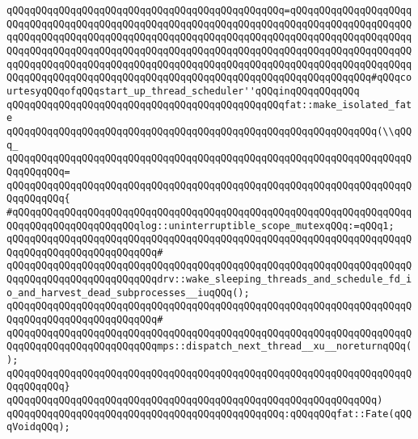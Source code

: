 \verb|qQQqqQQqqQQqqQQqqQQqqQQqqQQqqQQqqQQqqQQqqQQqqQQq=qQQqqQQqqQQqqQQqqQQqqQQqqQQqqQQqqQQqqQQqqQQqqQQqqQQqqQQqqQQqqQQqqQQqqQQqqQQqqQQqqQQqqQQqqQQqqQQqqQQqqQQqqQQqqQQqqQQqqQQqqQQqqQQqqQQqqQQqqQQqqQQqqQQqqQQqqQQqqQQqqQQqqQQqqQQqqQQqqQQqqQQqqQQqqQQqqQQqqQQqqQQqqQQqqQQqqQQqqQQqqQQqqQQqqQQqqQQqqQQqqQQqqQQqqQQqqQQqqQQqqQQqqQQqqQQqqQQqqQQqqQQqqQQqqQQqqQQqqQQqqQQqqQQqqQQqqQQqqQQqqQQqqQQqqQQqqQQqqQQqqQQqqQQqqQQqqQQqqQQqqQQq#qQQqcourtesyqQQqofqQQqstart_up_thread_scheduler''qQQqinqQQqqQQqqQQq|\newline
\verb|qQQqqQQqqQQqqQQqqQQqqQQqqQQqqQQqqQQqqQQqqQQqqQQqfat::make_isolated_fate|\newline
\verb|qQQqqQQqqQQqqQQqqQQqqQQqqQQqqQQqqQQqqQQqqQQqqQQqqQQqqQQqqQQqqQQq(\\qQQq_|\newline
\verb|qQQqqQQqqQQqqQQqqQQqqQQqqQQqqQQqqQQqqQQqqQQqqQQqqQQqqQQqqQQqqQQqqQQqqQQqqQQqqQQq=|\newline
\verb|qQQqqQQqqQQqqQQqqQQqqQQqqQQqqQQqqQQqqQQqqQQqqQQqqQQqqQQqqQQqqQQqqQQqqQQqqQQqqQQq{|\newline
\verb|#qQQqqQQqqQQqqQQqqQQqqQQqqQQqqQQqqQQqqQQqqQQqqQQqqQQqqQQqqQQqqQQqqQQqqQQqqQQqqQQqqQQqqQQqqQQqlog::uninterruptible_scope_mutexqQQq:=qQQq1;|\newline
\verb|qQQqqQQqqQQqqQQqqQQqqQQqqQQqqQQqqQQqqQQqqQQqqQQqqQQqqQQqqQQqqQQqqQQqqQQqqQQqqQQqqQQqqQQqqQQqqQQq#|\newline
\verb|qQQqqQQqqQQqqQQqqQQqqQQqqQQqqQQqqQQqqQQqqQQqqQQqqQQqqQQqqQQqqQQqqQQqqQQqqQQqqQQqqQQqqQQqqQQqqQQqdrv::wake_sleeping_threads_and_schedule_fd_io_and_harvest_dead_subprocesses__iuqQQq();|\newline
\verb|qQQqqQQqqQQqqQQqqQQqqQQqqQQqqQQqqQQqqQQqqQQqqQQqqQQqqQQqqQQqqQQqqQQqqQQqqQQqqQQqqQQqqQQqqQQqqQQq#|\newline
\verb|qQQqqQQqqQQqqQQqqQQqqQQqqQQqqQQqqQQqqQQqqQQqqQQqqQQqqQQqqQQqqQQqqQQqqQQqqQQqqQQqqQQqqQQqqQQqqQQqmps::dispatch_next_thread__xu__noreturnqQQq();|\newline
\verb|qQQqqQQqqQQqqQQqqQQqqQQqqQQqqQQqqQQqqQQqqQQqqQQqqQQqqQQqqQQqqQQqqQQqqQQqqQQqqQQq}|\newline
\verb|qQQqqQQqqQQqqQQqqQQqqQQqqQQqqQQqqQQqqQQqqQQqqQQqqQQqqQQqqQQqqQQq)|\newline
\verb|qQQqqQQqqQQqqQQqqQQqqQQqqQQqqQQqqQQqqQQqqQQqqQQq:qQQqqQQqfat::Fate(qQQqVoidqQQq);|\newline
\newline

